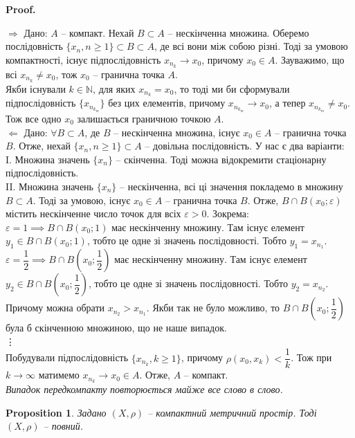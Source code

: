 \documentclass[a4paper, 10pt]{article}
\makeatletter
\def\rightproof{$\boxed{\Rightarrow}$ }
\def\leftproof{$\boxed{\Leftarrow}$ }
\theoremstyle{theoremdd}
\theoremstyle{theoremdd}
\theoremstyle{theoremdd}
\theoremstyle{theoremdd}
\theoremstyle{theoremdd}
\newtheorem{proposition}[theorem]{Proposition}
\theoremstyle{theoremdd}
\theoremstyle{theoremdd}
\theoremstyle{theoremdd}
\renewenvironment{proof}[1][Proof.\\]{\par
\pushQED{\hfill \qed}%
\normalfont \topsep6\p@\@plus6\p@\relax
\trivlist
\item\relax
{\bfseries
#1\@addpunct{.}}\hspace\labelsep\ignorespaces
}{%
\popQED\endtrivlist\@endpefalse
}
\makeatother
\begin{document}
\begin{proof}
\rightproof Дано: $A$ -- компакт. Нехай $B \subset A$ -- нескінченна множина. Оберемо послідовність $\{x_n, n \geq 1\} \subset B \subset A$, де всі вони між собою різні. Тоді за умовою компактності, існує підпослідовність $x_{n_k} \to x_0$, причому $x_0 \in A$. Зауважимо, що всі $x_{n_k} \neq x_0$, тож $x_0$ -- гранична точка $A$.\\
Якби існували $k \in \mathbb{N}$, для яких $x_{n_k} = x_0$, то тоді ми би сформували підпослідовність $\{x_{n_{k_m}}\}$ без цих елементів, причому $x_{n_{k_m}} \to x_0$, а тепер $x_{n_{k_m}} \neq x_0$. Тож все одно $x_0$ залишається граничною точкою $A$.
\bigskip \\
\leftproof Дано: $\forall B \subset A$, де $B$ -- нескінченна множина, існує $x_0 \in A$ -- гранична точка $B$. Отже, нехай $\{x_n, n \geq 1\} \subset A$ -- довільна послідовність. У нас є два варіанти:\\
I. Множина значень $\{x_n\}$ -- скінченна. Тоді можна відокремити стаціонарну підпослідовність.\\
II. Множина значень $\{x_n\}$ -- нескінченна, всі ці значення покладемо в множину $B \subset A$. Тоді за умовою, існує $x_0 \in A$ -- гранична точка $B$. Отже, $B \cap B(x_0;\varepsilon)$ містить нескінченне число точок для всіх $\varepsilon > 0$. Зокрема:\\
$\varepsilon = 1 \implies B \cap B(x_0;1)$ має нескінченну множину. Там існує елемент $y_1 \in B \cap B(x_0; 1)$, тобто це одне зі значень послідовності. Тобто $y_1 = x_{n_1}$.\\
$\varepsilon = \dfrac{1}{2} \implies B \cap B\left( x_0;\dfrac{1}{2} \right)$ має нескінченну множину. Там існує елемент $y_2 \in B \cap B\left( x_0;\dfrac{1}{2} \right)$, тобто це одне зі значень послідовності. Тобто $y_2 = x_{n_2}$. Причому можна обрати $x_{n_2} > x_{n_1}$. Якби так не було можливо, то $B \cap B\left(x_0; \dfrac{1}{2}\right)$ була б скінченною множиною, що не наше випадок.\\
\vdots \\
Побудували підпослідовність $\{x_{n_k}, k \geq 1\}$, причому $\rho(x_0,x_k) < \dfrac{1}{k}$. Тож при $k \to \infty$ матимемо $x_{n_k} \to x_0 \in A$. Отже, $A$ -- компакт.
\bigskip \\
\textit{Випадок передкомпакту повторюється майже все слово в слово.}
\end{proof}

\begin{proposition}
Задано $(X,\rho)$ -- компактний метричний простір. Тоді $(X,\rho)$ -- повний.
\end{proposition}
\end{document}
